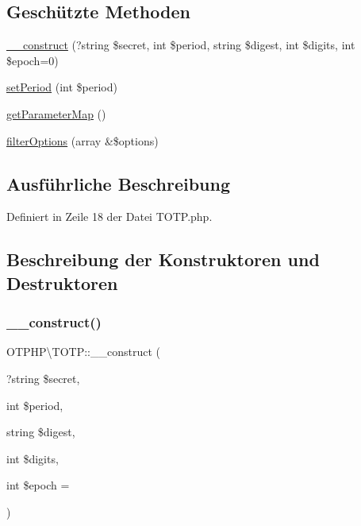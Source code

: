 \subsection*{Geschützte Methoden}
\begin{DoxyCompactItemize}
\item 
\mbox{\hyperlink{class_o_t_p_h_p_1_1_t_o_t_p_a26601f96b4e6fba945a7472ff255835c}{\+\_\+\+\_\+construct}} (?string \$secret, int \$period, string \$digest, int \$digits, int \$epoch=0)
\item 
\mbox{\hyperlink{class_o_t_p_h_p_1_1_t_o_t_p_ae0f7a48755d903954a0899a3326dfbf5}{set\+Period}} (int \$period)
\item 
\mbox{\hyperlink{class_o_t_p_h_p_1_1_t_o_t_p_a3f36aaa0ffdaede085cc8bdd52d8a14f}{get\+Parameter\+Map}} ()
\item 
\mbox{\hyperlink{class_o_t_p_h_p_1_1_t_o_t_p_a4917bf65d3738a14f431d6680cf245d4}{filter\+Options}} (array \&\$options)
\end{DoxyCompactItemize}


\subsection{Ausführliche Beschreibung}


Definiert in Zeile 18 der Datei T\+O\+T\+P.\+php.



\subsection{Beschreibung der Konstruktoren und Destruktoren}
\mbox{\label{class_o_t_p_h_p_1_1_t_o_t_p_a26601f96b4e6fba945a7472ff255835c}} 
\subsubsection{\texorpdfstring{\+\_\+\+\_\+construct()}{\_\_construct()}}
{\footnotesize\ttfamily O\+T\+P\+H\+P\textbackslash{}\+T\+O\+T\+P\+::\+\_\+\+\_\+construct (\begin{DoxyParamCaption}\item[{?string}]{\$secret,  }\item[{int}]{\$period,  }\item[{string}]{\$digest,  }\item[{int}]{\$digits,  }\item[{int}]{\$epoch = {} }\end{DoxyParamCaption})\hspace{0.3cm}{\ttfamily [protected]}}

